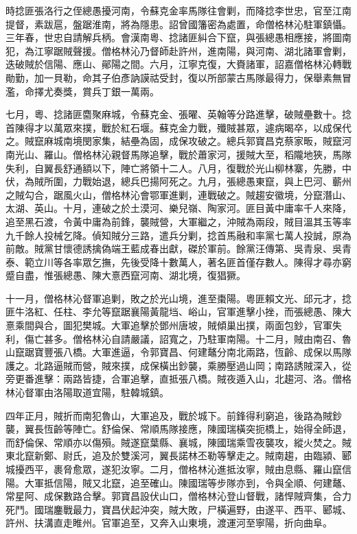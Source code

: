 \begin{pinyinscope}
時捻匪張洛行之侄總愚擾河南，令蘇克金率馬隊往會剿，而降捻李世忠，官至江南提督，素跋扈，盤踞淮南，將為隱患。詔曾國籓密為處置，命僧格林沁駐軍鎮懾。三年春，世忠自請解兵柄。會漢南粵、捻諸匪糾合下竄，與張總愚相應接，將圖南犯，為江寧踞賊聲援。僧格林沁乃督師赴許州，進南陽，與河南、湖北諸軍會剿，迭破賊於信陽、應山、鄖陽之間。六月，江寧克復，大賚諸軍，詔嘉僧格林沁轉戰勛勤，加一貝勒，命其子伯彥訥謨祜受封，復以所部蒙古馬隊最得力，保舉素無冒濫，命擇尤奏獎，賞兵丁銀一萬兩。

七月，粵、捻諸匪麕聚麻城，令蘇克金、張曜、英翰等分路進擊，破賊壘數十。捻首陳得才以萬眾來撲，戰於紅石堰。蘇克金力戰，殲賊甚眾，遽病暍卒，以成保代之。賊竄麻城南境閔家集，結壘為固，成保攻破之。總兵郭寶昌克蔡家畈，賊竄河南光山、羅山。僧格林沁親督馬隊追擊，戰於蕭家河，援賊大至，稻隴地狹，馬隊失利，自翼長舒通額以下，陣亡將領十二人。八月，復戰於光山柳林寨，先勝，中伏，為賊所圍，力戰始退，總兵巴揚阿死之。九月，張總愚東竄，與上巴河、蘄州之賊勾合，踞風火山，僧格林沁會鄂軍進剿，連戰破之。賊趨安徽境，分竄潛山、太湖、英山。十月，連破之於土漠河、樂兒嶺、陶家河。匪目黃中庸率千人來降，追至黑石渡，令黃中庸為前鋒，襲賊營，大軍繼之，沖賊為兩段，賊目溫其玉等率九千餘人投械乞降。偵知賊分三路，遣兵分剿，捻首馬融和率黨七萬人投誠，原為前敵。賊黨甘懷德誘擒偽端王藍成春出獻，磔於軍前。餘黨汪傳第、吳青泉、吳青泰、範立川等各率眾乞撫，先後受降十數萬人，著名匪首僅存數人。陳得才尋亦窮蹙自盡，惟張總愚、陳大憙西竄河南、湖北境，復猖獗。

十一月，僧格林沁督軍追剿，敗之於光山境，進至棗陽。粵匪賴文光、邱元才，捻匪牛洛紅、任柱、李允等竄踞襄陽黃龍垱、峪山，官軍進擊小挫，而張總愚、陳大憙乘間與合，圖犯樊城。大軍追擊於鄧州唐坡，賊傾巢出撲，兩面包鈔，官軍失利，傷亡甚多。僧格林沁自請嚴議，詔寬之，乃駐軍南陽。十二月，賊由南召、魯山竄踞寶豐張八橋。大軍進逼，令郭寶昌、何建鼇分南北兩路，恆齡、成保以馬隊護之。北路逼賊而營，賊來撲，成保橫出鈔襲，乘勝壓過山岡；南路誘賊深入，從旁更番進擊：兩路皆捷，合軍追擊，直抵張八橋。賊夜遁入山，北趨河、洛。僧格林沁督軍由洛陽取道宜陽，駐韓城鎮。

四年正月，賊折而南犯魯山，大軍追及，戰於城下。前鋒得利窮追，後路為賊鈔襲，翼長恆齡等陣亡。舒倫保、常順馬隊接應，陳國瑞橫突扼橋上，始得全師退，而舒倫保、常順亦以傷殞。賊遂竄葉縣、襄城，陳國瑞乘雪夜襲攻，縱火焚之。賊東北竄新鄭、尉氏，追及於雙溪河，翼長諾林丕勒等擊走之。賊南趨，由臨潁、郾城擾西平，裹脅愈眾，遂犯汝寧。二月，僧格林沁進抵汝寧，賊由息縣、羅山竄信陽。大軍抵信陽，賊又北竄，追至確山。陳國瑞等步隊亦到，令與全順、何建鼇、常星阿、成保數路合擊。郭寶昌設伏山口，僧格林沁登山督戰，諸悍賊齊集，合力死鬥。國瑞鏖戰最力，寶昌伏起沖突，賊大敗，尸橫遍野，由遂平、西平、郾城、許州、扶溝直走睢州。官軍追至，又奔入山東境，渡運河至寧陽，折向曲阜。


\end{pinyinscope}
